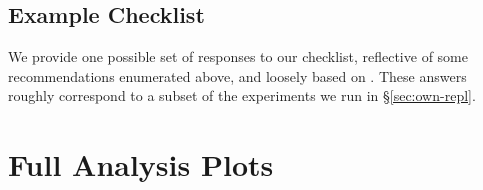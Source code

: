 \subsection{Example Checklist}

We provide one possible set of responses to our checklist, reflective of some recommendations enumerated above, and loosely based on \citet{hoffmann2022training}. These answers roughly correspond to a subset of the experiments we run in \S\ref{sec:own-repl}.

\newpage



\newpage


\section{Full Analysis Plots}\label{sec:app_megafigure}



